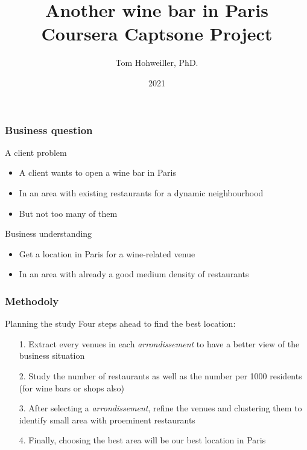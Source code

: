 \documentclass{beamer}
\title{Another wine bar in Paris \\ {Coursera Captsone Project}}
\author{Tom Hohweiller, PhD.}
\date{2021}
\begin{document}
\frame{\titlepage}

\begin{frame}
	\frametitle{Business question}
	\begin{block}{A client problem}
		\begin{itemize}
			\item A client wants to open a wine bar in Paris
			\item In an area with existing restaurants for a dynamic neighbourhood 
			\item But not too many of them
		\end{itemize}
	\end{block}

	\begin{block}{Business understanding}
		\begin{itemize}
			\item Get a location in Paris for a wine-related venue
			\item In an area with already a good medium density of restaurants
		\end{itemize}
	\end{block}
\end{frame}


\begin{frame}
	\frametitle{Methodoly}
	\begin{block}{Planning the study}
		Four steps ahead to find the best location:
		\begin{itemize}
			\item[1.] Extract every venues in each \textit{arrondissement} to have a better view of the business situation
			\item[2.] Study the number of restaurants as well as the number per 1000 residents (for wine bars or shops also)
			\item[3.] After selecting a \textit{arrondissement}, refine the venues and clustering them to identify small area with proeminent restaurants
			\item[4.] Finally, choosing the best area will be our best location in Paris
		\end{itemize}
	\end{block}
\end{frame}
\end{document}
